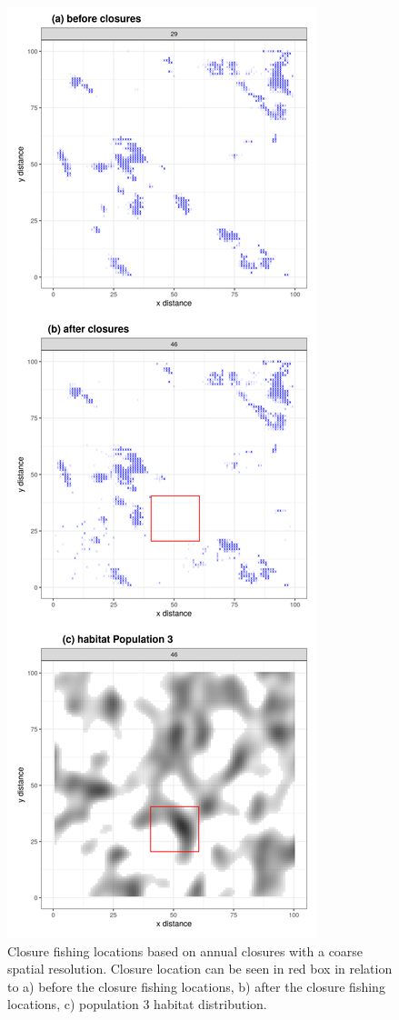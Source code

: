\documentclass[review]{elsarticle}
\begin{document}
\begin{figure}[!ht]
	\centering
	\includegraphics[width =0.5\linewidth]{./Plots/Closure_fishing_locations_yearly}
	\caption{Closure fishing locations based on annual closures with a
		coarse spatial resolution. Closure location can be seen in red
		box in relation to a) before the closure fishing locations, b)
		after the closure fishing locations, c) population 3 habitat
		distribution.}
	\label{fig:17}
\end{figure}	
\end{document}
